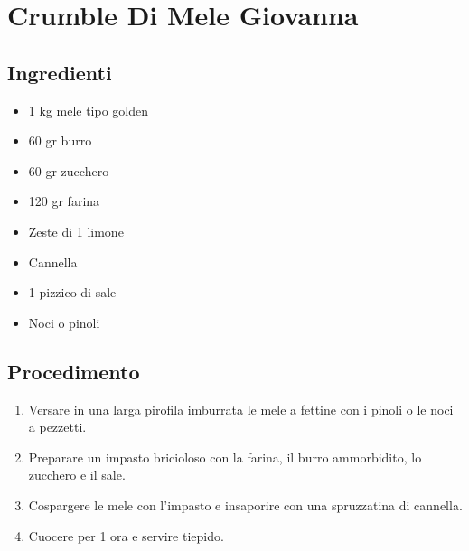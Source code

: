 \section{Crumble Di Mele Giovanna}
\subsection{Ingredienti}
\begin{itemize}
\item 1 kg mele tipo golden  
\item 60 gr burro   
\item 60 gr zucchero  
\item 120 gr farina  
\item Zeste di 1 limone  
\item Cannella  
\item 1 pizzico di sale  
\item Noci o pinoli
\end{itemize}
\subsection{Procedimento}
\begin{enumerate}
\item  Versare in una larga pirofila imburrata le mele a fettine con i pinoli o le noci a pezzetti.   
\item  Preparare un impasto bricioloso con la farina, il burro ammorbidito, lo zucchero e il sale.   
\item  Cospargere le mele con l'impasto e insaporire con una spruzzatina di cannella.  
\item  Cuocere per 1 ora e servire tiepido.
\end{enumerate}
